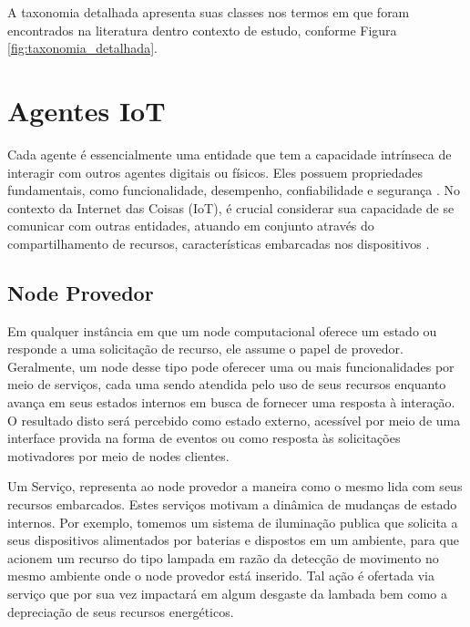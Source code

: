 A taxonomia detalhada apresenta suas classes nos termos em que foram encontrados na literatura dentro contexto de estudo, conforme Figura \ref{fig:taxonomia_detalhada}.

\section{Agentes \acs{IoT}}
Cada agente é essencialmente uma entidade que tem a capacidade intrínseca de interagir com outros agentes digitais ou físicos. Eles possuem propriedades fundamentais, como funcionalidade, desempenho, confiabilidade e segurança \cite{avizienis_basic_2004}. No contexto da Internet das Coisas (IoT), é crucial considerar sua capacidade de se comunicar com outras entidades, atuando em conjunto através do compartilhamento de recursos, características embarcadas nos dispositivos \cite{asghari_internet_2019}.


\subsection{Node Provedor}

Em qualquer instância em que um node computacional oferece um estado ou responde a uma solicitação de recurso, ele assume o papel de provedor. Geralmente, um node desse tipo pode oferecer uma ou mais funcionalidades por meio de serviços, cada uma sendo atendida pelo uso de seus recursos enquanto avança em seus estados internos em busca de fornecer uma resposta à interação. O resultado disto será percebido como  estado externo, acessível por meio de uma interface provida na forma de eventos ou como resposta às solicitações motivadores por meio de nodes clientes. 

Um Serviço, representa ao node provedor a maneira como o mesmo lida com seus recursos embarcados. Estes serviços motivam a dinâmica de mudanças de estado internos.  Por exemplo, tomemos um sistema de iluminação publica que solicita a seus dispositivos alimentados por baterias e dispostos em um ambiente, para que acionem um recurso do tipo lampada em razão da detecção de movimento no mesmo ambiente onde o node provedor está inserido. Tal ação é ofertada  via serviço que por sua vez impactará em algum desgaste da lambada bem como a depreciação de seus recursos energéticos.

